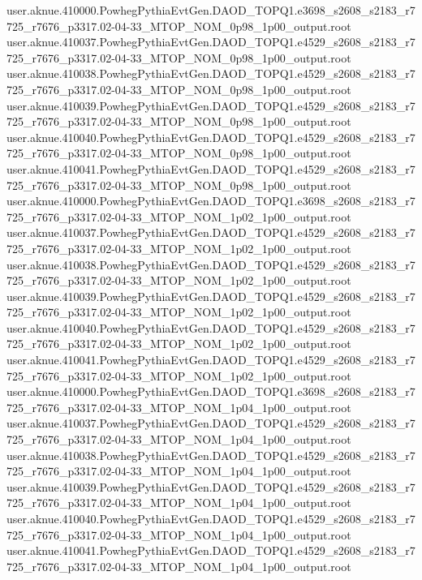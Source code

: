 {user.aknue.410000.PowhegPythiaEvtGen.DAOD_TOPQ1.e3698_s2608_s2183_r7725_r7676_p3317.02-04-33_MTOP_NOM_0p98_1p00_output.root\\
user.aknue.410037.PowhegPythiaEvtGen.DAOD_TOPQ1.e4529_s2608_s2183_r7725_r7676_p3317.02-04-33_MTOP_NOM_0p98_1p00_output.root\\
user.aknue.410038.PowhegPythiaEvtGen.DAOD_TOPQ1.e4529_s2608_s2183_r7725_r7676_p3317.02-04-33_MTOP_NOM_0p98_1p00_output.root\\
user.aknue.410039.PowhegPythiaEvtGen.DAOD_TOPQ1.e4529_s2608_s2183_r7725_r7676_p3317.02-04-33_MTOP_NOM_0p98_1p00_output.root\\
user.aknue.410040.PowhegPythiaEvtGen.DAOD_TOPQ1.e4529_s2608_s2183_r7725_r7676_p3317.02-04-33_MTOP_NOM_0p98_1p00_output.root\\
user.aknue.410041.PowhegPythiaEvtGen.DAOD_TOPQ1.e4529_s2608_s2183_r7725_r7676_p3317.02-04-33_MTOP_NOM_0p98_1p00_output.root\\

user.aknue.410000.PowhegPythiaEvtGen.DAOD_TOPQ1.e3698_s2608_s2183_r7725_r7676_p3317.02-04-33_MTOP_NOM_1p02_1p00_output.root\\
user.aknue.410037.PowhegPythiaEvtGen.DAOD_TOPQ1.e4529_s2608_s2183_r7725_r7676_p3317.02-04-33_MTOP_NOM_1p02_1p00_output.root\\
user.aknue.410038.PowhegPythiaEvtGen.DAOD_TOPQ1.e4529_s2608_s2183_r7725_r7676_p3317.02-04-33_MTOP_NOM_1p02_1p00_output.root\\
user.aknue.410039.PowhegPythiaEvtGen.DAOD_TOPQ1.e4529_s2608_s2183_r7725_r7676_p3317.02-04-33_MTOP_NOM_1p02_1p00_output.root\\
user.aknue.410040.PowhegPythiaEvtGen.DAOD_TOPQ1.e4529_s2608_s2183_r7725_r7676_p3317.02-04-33_MTOP_NOM_1p02_1p00_output.root\\
user.aknue.410041.PowhegPythiaEvtGen.DAOD_TOPQ1.e4529_s2608_s2183_r7725_r7676_p3317.02-04-33_MTOP_NOM_1p02_1p00_output.root\\

user.aknue.410000.PowhegPythiaEvtGen.DAOD_TOPQ1.e3698_s2608_s2183_r7725_r7676_p3317.02-04-33_MTOP_NOM_1p04_1p00_output.root\\
user.aknue.410037.PowhegPythiaEvtGen.DAOD_TOPQ1.e4529_s2608_s2183_r7725_r7676_p3317.02-04-33_MTOP_NOM_1p04_1p00_output.root\\
user.aknue.410038.PowhegPythiaEvtGen.DAOD_TOPQ1.e4529_s2608_s2183_r7725_r7676_p3317.02-04-33_MTOP_NOM_1p04_1p00_output.root\\
user.aknue.410039.PowhegPythiaEvtGen.DAOD_TOPQ1.e4529_s2608_s2183_r7725_r7676_p3317.02-04-33_MTOP_NOM_1p04_1p00_output.root\\
user.aknue.410040.PowhegPythiaEvtGen.DAOD_TOPQ1.e4529_s2608_s2183_r7725_r7676_p3317.02-04-33_MTOP_NOM_1p04_1p00_output.root\\
user.aknue.410041.PowhegPythiaEvtGen.DAOD_TOPQ1.e4529_s2608_s2183_r7725_r7676_p3317.02-04-33_MTOP_NOM_1p04_1p00_output.root\\

}
